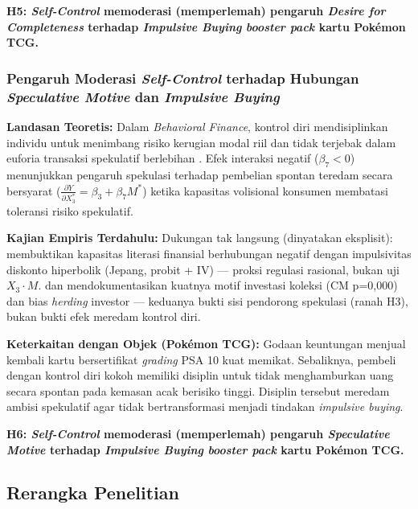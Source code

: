 \documentclass[12pt,a4paper]{article}
\numberwithin{equation}{section}
\numberwithin{table}{section}
\numberwithin{figure}{section}
\begin{document}
\vspace{0.2cm}
\textbf{H5: \emph{Self-Control} memoderasi (memperlemah) pengaruh \emph{Desire for Completeness} terhadap \emph{Impulsive Buying} \emph{booster pack} kartu Pok\'emon TCG.}

\subsubsection{Pengaruh Moderasi \emph{Self-Control} terhadap Hubungan \emph{Speculative Motive} dan \emph{Impulsive Buying}}

\noindent\textbf{Landasan Teoretis:} Dalam \emph{Behavioral Finance}, kontrol diri mendisiplinkan individu untuk menimbang risiko kerugian modal riil dan tidak terjebak dalam euforia transaksi spekulatif berlebihan \citep{thaler1981economic, barber2008all}. Efek interaksi negatif ($\beta_7 < 0$) menunjukkan pengaruh spekulasi terhadap pembelian spontan teredam secara bersyarat ($\frac{\partial Y}{\partial X_3^*} = \beta_3 + \beta_7 M^*$) ketika kapasitas volisional konsumen membatasi toleransi risiko spekulatif.

\noindent\textbf{Kajian Empiris Terdahulu:} Dukungan tak langsung (dinyatakan eksplisit): \citet{katauke2023financial} membuktikan kapasitas literasi finansial berhubungan negatif dengan impulsivitas diskonto hiperbolik (Jepang, probit + IV) — proksi regulasi rasional, bukan uji $X_3 \cdot M$. \citet{aryadi2024personal} dan \citet{colline2024biases} mendokumentasikan kuatnya motif investasi koleksi (CM p=0,000) dan bias \emph{herding} investor — keduanya bukti sisi pendorong spekulasi (ranah H3), bukan bukti efek meredam kontrol diri.

\noindent\textbf{Keterkaitan dengan Objek (Pok\'emon TCG):} Godaan keuntungan menjual kembali kartu bersertifikat \emph{grading} PSA 10 kuat memikat. Sebaliknya, pembeli dengan kontrol diri kokoh memiliki disiplin untuk tidak menghamburkan uang secara spontan pada kemasan acak berisiko tinggi. Disiplin tersebut meredam ambisi spekulatif agar tidak bertransformasi menjadi tindakan \emph{impulsive buying}.

\vspace{0.2cm}
\textbf{H6: \emph{Self-Control} memoderasi (memperlemah) pengaruh \emph{Speculative Motive} terhadap \emph{Impulsive Buying} \emph{booster pack} kartu Pok\'emon TCG.}

\subsection{Rerangka Penelitian}
\end{document}
